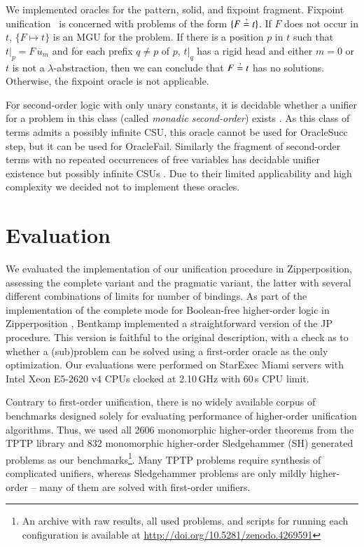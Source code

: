 We implemented oracles for the pattern, solid, and fixpoint fragment. 
Fixpoint unification~\cite{gh-75-unification} is concerned with problems of the form
$\{F \unif t\}$. If $F$ does not occur in $t$, $\{ F \mapsto t \}$
is an MGU for the problem. If there is a position $p$ in $t$ such that 
$t|_p = F \, \overline{u}_m$
and for each prefix $q\neq p$ of $p$, $t|_q$ has a rigid head and either $m=0$ or $t$ is not a $\lambda$-abstraction,
then we can conclude that $F \unif t$ has no solutions. Otherwise,
the fixpoint oracle is not applicable.

For second-order logic with only unary constants, it is decidable whether
a unifier for a problem in this class (called
\emph{monadic second-order}) exists \cite{wf-88-monadicunif}. As this class of terms admits a
possibly infinite CSU, this oracle cannot be used for \textsf{OracleSucc} step,
but it can be used for \textsf{OracleFail}. Similarly the fragment of
second-order terms with no repeated occurrences of free variables has decidable
unifier existence but possibly infinite CSUs
\cite{gd-01-unif-chapter}. Due to their limited applicability and high complexity we
decided not to implement these oracles.



\section{Evaluation}
\label{sec:unif:evaluation}We evaluated the implementation of our unification procedure in Zipperposition,
assessing the complete variant and the pragmatic variant, the latter with several
different combinations of limits for number of bindings. As part of the
implementation of the complete mode for Boolean-free higher-order logic in
Zipperposition \cite{bbtvw-21-sup-lam}, Bentkamp implemented a straightforward
version of the JP procedure. This version is faithful to the original description,
with a check as to whether a (sub)problem can be solved using a first-order oracle
as the only optimization. Our evaluations were performed on StarExec Miami
\cite{sst-14-starexec} servers with Intel Xeon E5-{2620 v4} CPUs clocked at {2.10}\,GHz with 60\,s CPU limit.

Contrary to first-order unification, there is no widely available corpus of
benchmarks designed solely for evaluating performance of higher-order
unification algorithms. Thus, we used all 2606 monomorphic higher-order theorems
from the TPTP library \cite{gs-17-tptp} and 832 monomorphic higher-order
Sledgehammer (SH) generated problems \cite{ns-13-leo2sh} as our benchmarks\footnote{An archive with raw
results, all used problems, and scripts for running each configuration is
available at \url{http://doi.org/10.5281/zenodo.4269591}}. 
Many TPTP problems require synthesis of complicated unifiers,
whereas Sledgehammer problems are only mildly higher-order -- many of them are
solved with first-order unifiers.

